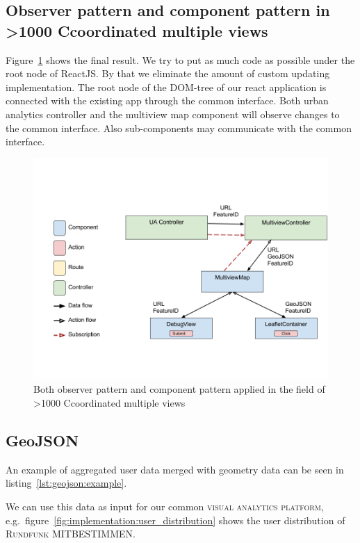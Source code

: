 \documentclass{article}
\newcommand{\rufu}{\textsc{Rundfunk MITBESTIMMEN}}
\newcommand{\visan}{\textsc{visual analytics platform}}
\newcommand\hmm[1]{\ifnum\ifhmode\spacefactor\else2000\fi>1000 \uppercase{#1}\else#1\fi}
\newcommand{\cmvs}{\hmm{c}oordinated multiple views}
\begin{document}
\subsection{Observer pattern and component pattern in \cmvs{}}
Figure~\ref{fig:implementation:both-patterns} shows the final result.
We try to put as much code as possible under the root node of ReactJS\@.
By that we eliminate the amount of custom updating implementation.
The root node of the DOM-tree of our react application is connected with the existing app through the common interface.
Both urban analytics controller and the multiview map component will observe changes to the common interface.
Also sub-components may communicate with the common interface.


\begin{figure}[h!]
  \centering
  \includegraphics[width=\textwidth]{images/both-patterns-implemented.png}
  \caption{%
    Both observer pattern and component pattern applied in the field of \cmvs{}
  }\label{fig:implementation:both-patterns}
\end{figure}


\subsection{GeoJSON}

An example of aggregated user data merged with geometry data can be seen in listing~\ref{lst:geojson:example}.


We can use this data as input for our common \visan{}, e.g.\ figure~\ref{fig:implementation:user_distribution} shows the user distribution of \rufu{}.
\end{document}
